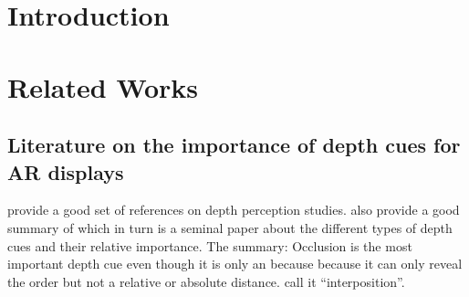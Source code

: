 \pagestyle{plain}
\chapter{Introduction}

\chapter{Related Works}
\section{Literature on the importance of depth cues for AR displays}
\cite[Sec. 4D]{sielhorst2008advanced} provide a good set of references on depth perception studies. \cite[Sec. 4D]{sielhorst2008advanced} also provide a good summary of \cite{cutting1995perceiving} which in turn is a seminal paper about the different types of depth cues and their relative importance. The summary: Occlusion is the most important depth cue even though it is only an  because because it can only reveal the order but not a relative or absolute distance. \cite[Sec. 4D]{sielhorst2008advanced} call it ``interposition''.
